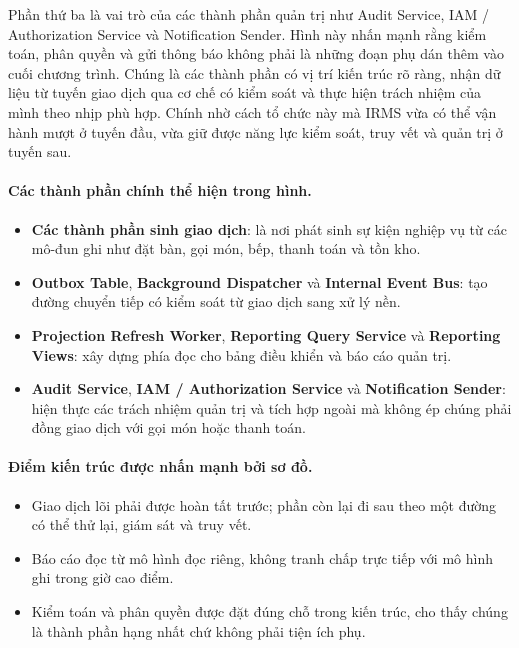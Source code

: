 \documentclass[11pt,a4paper]{article}
\begin{document}
Phần thứ ba là vai trò của các thành phần quản trị như \textsf{Audit Service}, \textsf{IAM / Authorization Service} và \textsf{Notification Sender}. Hình này nhấn mạnh rằng kiểm toán, phân quyền và gửi thông báo không phải là những đoạn phụ dán thêm vào cuối chương trình. Chúng là các thành phần có vị trí kiến trúc rõ ràng, nhận dữ liệu từ tuyến giao dịch qua cơ chế có kiểm soát và thực hiện trách nhiệm của mình theo nhịp phù hợp. Chính nhờ cách tổ chức này mà IRMS vừa có thể vận hành mượt ở tuyến đầu, vừa giữ được năng lực kiểm soát, truy vết và quản trị ở tuyến sau.

\paragraph{Các thành phần chính thể hiện trong hình.}
\begin{itemize}
  \item \textbf{Các thành phần sinh giao dịch}: là nơi phát sinh sự kiện nghiệp vụ từ các mô-đun ghi như đặt bàn, gọi món, bếp, thanh toán và tồn kho.
  \item \textbf{Outbox Table}, \textbf{Background Dispatcher} và \textbf{Internal Event Bus}: tạo đường chuyển tiếp có kiểm soát từ giao dịch sang xử lý nền.
  \item \textbf{Projection Refresh Worker}, \textbf{Reporting Query Service} và \textbf{Reporting Views}: xây dựng phía đọc cho bảng điều khiển và báo cáo quản trị.
  \item \textbf{Audit Service}, \textbf{IAM / Authorization Service} và \textbf{Notification Sender}: hiện thực các trách nhiệm quản trị và tích hợp ngoài mà không ép chúng phải đồng giao dịch với gọi món hoặc thanh toán.
\end{itemize}

\paragraph{Điểm kiến trúc được nhấn mạnh bởi sơ đồ.}
\begin{itemize}
  \item Giao dịch lõi phải được hoàn tất trước; phần còn lại đi sau theo một đường có thể thử lại, giám sát và truy vết.
  \item Báo cáo đọc từ mô hình đọc riêng, không tranh chấp trực tiếp với mô hình ghi trong giờ cao điểm.
  \item Kiểm toán và phân quyền được đặt đúng chỗ trong kiến trúc, cho thấy chúng là thành phần hạng nhất chứ không phải tiện ích phụ.
\end{itemize}
\end{document}
